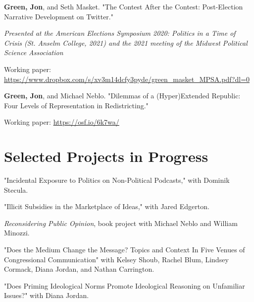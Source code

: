 \documentclass[letterpaper]{article}
\renewenvironment{itemize}{
  \begin{list}{}{
    \setlength{\leftmargin}{1.5em}
  }
}{
  \end{list}
}
\begin{document}
\begin{itemize}
\item \textbf{Green, Jon}, and Seth Masket. "The Contest After the Contest: Post-Election Narrative Development on Twitter." 
\begin{itemize}
\item \textit{Presented at the American Elections Symposium 2020: Politics in a Time of Crisis (St. Anselm College, 2021) and the 2021 meeting of the Midwest Political Science Association}
\item Working paper: \url{https://www.dropbox.com/s/xv3m14dcfy3pyde/green_masket_MPSA.pdf?dl=0}
\end{itemize}

\item \textbf{Green, Jon}, and Michael Neblo. "Dilemmas of a (Hyper)Extended Republic: Four Levels of Representation in Redistricting." 
\begin{itemize}
\item Working paper: \url{https://osf.io/6k7wa/}
\end{itemize}

\end{itemize}

\section*{Selected Projects in Progress}

\begin{itemize}

\item "Incidental Exposure to Politics on Non-Political Podcasts," with Dominik Stecula.

\item "Illicit Subsidies in the Marketplace of Ideas," with Jared Edgerton.

\item \textit{Reconsidering Public Opinion}, book project with Michael Neblo and William Minozzi.


\item "Does the Medium Change the Message? Topics and Context In Five Venues of Congressional Communication" with Kelsey Shoub, Rachel Blum, Lindsey Cormack, Diana Jordan, and Nathan Carrington.

\item "Does Priming Ideological Norms Promote Ideological Reasoning on Unfamiliar Issues?" with Diana Jordan.

\end{itemize}
\end{document}

